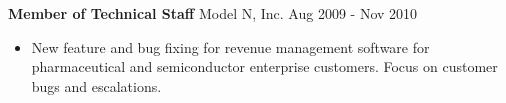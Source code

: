 \textbf{Member of Technical Staff}
Model N, Inc. \hfill Aug 2009 - Nov 2010
\begin{itemize} \itemsep -2pt %
\item New feature and bug fixing for revenue management software for pharmaceutical and semiconductor enterprise customers. Focus on customer bugs and escalations.

\end{itemize}
